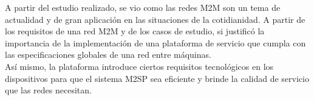 \documentclass[journal]{IEEEtran}
\begin{document}
A partir del estudio realizado, se vio como las redes M2M son un tema de actualidad y de gran aplicación en las situaciones de la cotidianidad. A partir de los requisitos de una red M2M y de los casos de estudio, si justificó la importancia de la implementación de una plataforma de servicio que cumpla con las especificaciones globales de una red entre máquinas.\\

Así mismo, la plataforma introduce ciertos requisitos tecnológicos en los dispositivos para que el sistema M2SP sea eficiente y brinde la calidad de servicio que las redes necesitan.



%
\end{document}
